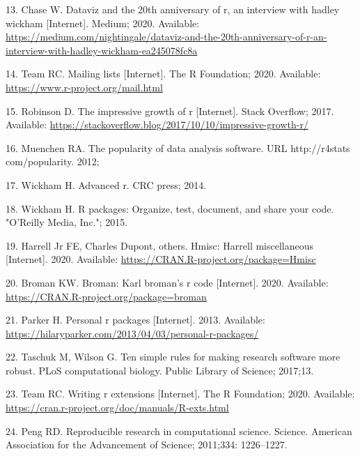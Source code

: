 \documentclass[10pt,letterpaper]{article}
\begin{document}
\leavevmode\hypertarget{ref-chase2020}{}%
13. Chase W. Dataviz and the 20th anniversary of r, an interview with
hadley wickham {[}Internet{]}. Medium; 2020. Available:
\url{https://medium.com/nightingale/dataviz-and-the-20th-anniversary-of-r-an-interview-with-hadley-wickham-ea245078fc8a}

\leavevmode\hypertarget{ref-Rmail2020}{}%
14. Team RC. Mailing lists {[}Internet{]}. The R Foundation; 2020.
Available: \url{https://www.r-project.org/mail.html}

\leavevmode\hypertarget{ref-robinson2017}{}%
15. Robinson D. The impressive growth of r {[}Internet{]}. Stack
Overflow; 2017. Available:
\url{https://stackoverflow.blog/2017/10/10/impressive-growth-r/}

\leavevmode\hypertarget{ref-muenchen2012}{}%
16. Muenchen RA. The popularity of data analysis software. URL
http://r4stats com/popularity. 2012;

\leavevmode\hypertarget{ref-wickham2014}{}%
17. Wickham H. Advanced r. CRC press; 2014.

\leavevmode\hypertarget{ref-wickham2015}{}%
18. Wickham H. R packages: Organize, test, document, and share your
code. "O'Reilly Media, Inc."; 2015.

\leavevmode\hypertarget{ref-Hmisc}{}%
19. Harrell Jr FE, Charles Dupont, others. Hmisc: Harrell miscellaneous
{[}Internet{]}. 2020. Available:
\url{https://CRAN.R-project.org/package=Hmisc}

\leavevmode\hypertarget{ref-broman}{}%
20. Broman KW. Broman: Karl broman's r code {[}Internet{]}. 2020.
Available: \url{https://CRAN.R-project.org/package=broman}

\leavevmode\hypertarget{ref-parker2013}{}%
21. Parker H. Personal r packages {[}Internet{]}. 2013. Available:
\url{https://hilaryparker.com/2013/04/03/personal-r-packages/}

\leavevmode\hypertarget{ref-taschuk2017}{}%
22. Taschuk M, Wilson G. Ten simple rules for making research software
more robust. PLoS computational biology. Public Library of Science;
2017;13.

\leavevmode\hypertarget{ref-Rcore2020}{}%
23. Team RC. Writing r extensions {[}Internet{]}. The R Foundation;
2020. Available:
\url{https://cran.r-project.org/doc/manuals/R-exts.html}

\leavevmode\hypertarget{ref-peng2011}{}%
24. Peng RD. Reproducible research in computational science. Science.
American Association for the Advancement of Science; 2011;334:
1226--1227.
\end{document}
